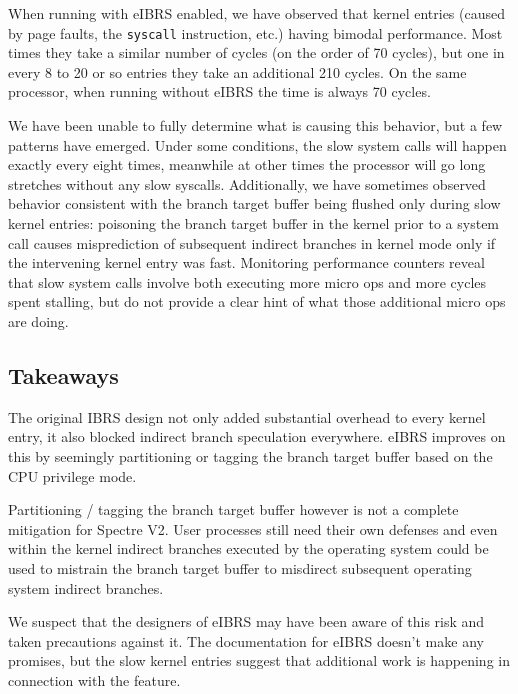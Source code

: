 When running with eIBRS enabled, we have observed that kernel entries (caused by page faults, the \texttt{syscall} instruction, etc.) having bimodal performance.
Most times they take a similar number of cycles (on the order of 70 cycles), but one in every 8 to 20 or so entries they take an additional 210 cycles.
On the same processor, when running without eIBRS the time is always 70 cycles.

We have been unable to fully determine what is causing this behavior, but a few patterns have emerged.
Under some conditions, the slow system calls will happen exactly every eight times, meanwhile at other times the processor will go long stretches without any slow syscalls.
Additionally, we have sometimes observed behavior consistent with the branch target buffer being flushed only during slow kernel entries: poisoning the branch target buffer in the kernel prior to a system call causes misprediction of subsequent indirect branches in kernel mode only if the intervening kernel entry was fast.
Monitoring performance counters reveal that slow system calls involve both executing more micro ops and more cycles spent stalling, but do not provide a clear hint of what those additional micro ops are doing.

\subsection{Takeaways}
The original IBRS design not only added substantial overhead to every kernel entry, it also blocked indirect branch speculation everywhere.
eIBRS improves on this by seemingly partitioning or tagging the branch target buffer based on the CPU privilege mode.

Partitioning / tagging the branch target buffer however is not a complete mitigation for Spectre V2.
User processes still need their own defenses and even within the kernel indirect branches executed by the operating system could be used to mistrain the branch target buffer to misdirect subsequent operating system indirect branches.

We suspect that the designers of eIBRS may have been aware of this risk and taken precautions against it.
The documentation for eIBRS doesn't make any promises, but the slow kernel entries suggest that additional work is happening in connection with the feature.
